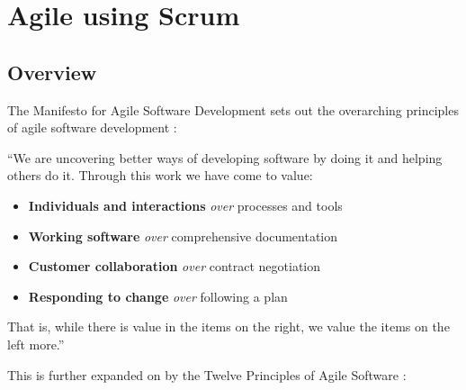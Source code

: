 
\chapter{Agile using Scrum} %

\label{Chapter_Agile_and_Scrum} %


\section{Overview}

The Manifesto for Agile Software Development sets out the overarching principles
of agile software development \parencite{Beck2001ManifestoFA}:

\begin{displayquote}
``We are uncovering better ways of developing software by doing it and helping 
others do it. Through this work we have come to value:

\begin{itemize}
	\item \textbf{Individuals and interactions} \textit{over} processes and tools 
	\item \textbf{Working software} \textit{over} comprehensive documentation 
	\item \textbf{Customer collaboration} \textit{over} contract negotiation 
	\item \textbf{Responding to change} \textit{over} following a plan 
\end{itemize}

That is, while there is value in the items on the right, we value the items on
the left more.''
\end{displayquote}

This is further expanded on by the Twelve Principles of Agile Software
\parencite{Beck2001ManifestoFA}:

